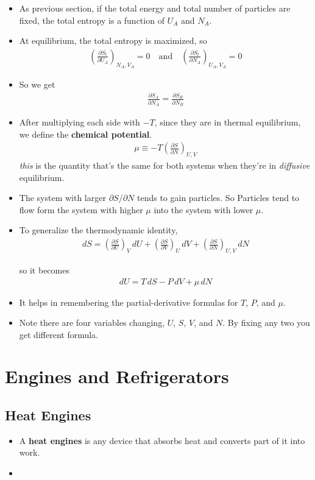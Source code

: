 \documentclass{book}
\begin{document}
\begin{itemize}
	\item As previous section, if the total energy and total number of particles are fixed, the total entropy is a
	      function of $ U_{A} $ and $ N_{A} $.
	\item At equilibrium, the total entropy is maximized, so
	      \begin{align}
		      \left( \frac{\partial S_{t}}{\partial U_{A}} \right)_{N_A, V_A} = 0
		      \quad \text{and} \quad
		      \left( \frac{\partial S_{t}}{\partial N_{A}} \right)_{U_A, V_A} = 0
	      \end{align}
	\item So we get
	      \begin{align}
		      \frac{\partial S_{A}}{\partial N_{A}} = \frac{\partial S_{B}}{\partial N_{B}}
	      \end{align}
	\item After multiplying each side with $-T$, since they are in thermal equilibrium, we define the
	      \textbf{chemical potential}.
	      \begin{align}
		      \label{eq:chemical potential}
		      \mu \equiv -T \left( \frac{\partial S}{\partial N} \right)_{U,V}
	      \end{align}
	      \textit{this} is the quantity that's the same for both systems when they're in \textit{diffusive} equilibrium.
	\item The system with larger $ \partial S/ \partial N$ tends to gain particles. So Particles tend to flow
	      form the system with higher $ \mu $ into the system with lower $ \mu $.
	\item To generalize the thermodynamic identity,
	      \begin{align}
		      dS = \left( \frac{\partial S}{\partial U} \right)_{V} \, dU
		      + \left( \frac{\partial S}{\partial V} \right)_{U}\, dV
		      + \left( \frac{\partial S}{\partial N} \right)_{U, V} \, dN
	      \end{align}

				so it becomes
				\begin{align}
					\label{eq:thermo identity with N}
					dU = T\, dS - P\, dV + \mu \, dN
				\end{align}
	\item It helps in remembering the partial-derivative formulas for $ T $, $ P $, and $ \mu $.
	\item Note there are four variables changing, $ U $, $ S $, $ V $, and $ N $. By fixing any two you get different
				formula.
\end{itemize}



\chapter{Engines and Refrigerators}
\label{ch:engines and reg}

\section{Heat Engines}%
\label{sec:heat engines}

\begin{itemize}
  \item A \textbf{heat engines} is any device that absorbs heat and converts part of it into work.
				 \item

\end{itemize}
\end{document}
